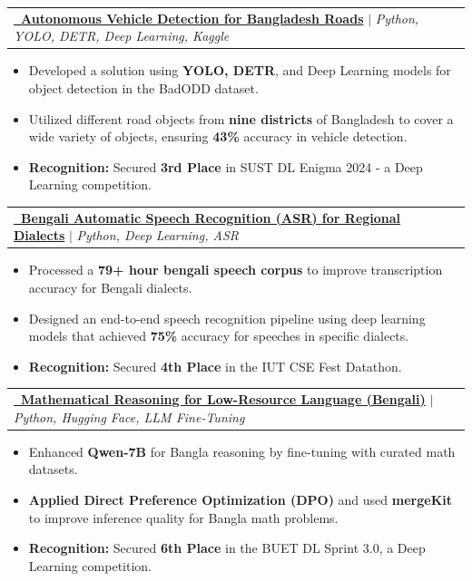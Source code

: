 \documentclass[letterpaper,11pt]{article}
\makeatletter
\newcommand{\customItem}[1]{
  \item\small{
    {#1 \vspace{-2pt}}
  }
}
\newcommand{\customProject}[2]{
    \item
    \begin{tabular*}{1.001\textwidth}{l@{\extracolsep{\fill}}r}
      \small#1 & \textbf{\small #2}\\
    \end{tabular*}\vspace{-7pt}
}
\newcommand{\customItemListStart}{\begin{itemize}}
\newcommand{\customItemListEnd}{\end{itemize}\vspace{-5pt}}
\makeatother
\begin{document}
      \customProject
          {\textbf{\href{https://www.kaggle.com/competitions/dl-enigma-10-sust-cse-carnival-2024/discussion/477648}
          {\faLink\ Autonomous Vehicle Detection for Bangladesh Roads}} $|$ 
          \emph{Python, YOLO, DETR, Deep Learning, Kaggle}}
          {}
          \customItemListStart
            \customItem{Developed a solution using \textbf{YOLO, DETR}, and Deep Learning models for object detection in the BadODD dataset.}
            \customItem{Utilized different road objects from \textbf{nine districts} of Bangladesh to cover a wide variety of objects, ensuring \textbf{43\%} accuracy in vehicle detection.}
            \customItem{\textbf{Recognition:} Secured \textbf{3rd Place} in SUST DL Enigma 2024 - a Deep Learning competition.}
          \customItemListEnd
          \vspace{-13pt}

      \customProject
          {\textbf{\href{https://www.kaggle.com/competitions/ben10/code?competitionId=73047\&searchQuery=DataDojo}
          {\faLink\ Bengali Automatic Speech Recognition (ASR) for Regional Dialects}} $|$ 
          \emph{Python, Deep Learning, ASR}}
          {}
          \customItemListStart
            \customItem{Processed a \textbf{79+ hour bengali speech corpus} to improve transcription accuracy for Bengali dialects.}
            \customItem{Designed an end-to-end speech recognition pipeline using deep learning models that achieved \textbf{75\%} accuracy for speeches in specific dialects.}
            \customItem{\textbf{Recognition:} Secured \textbf{4th Place} in the IUT CSE Fest Datathon.}
          \customItemListEnd
          \vspace{-13pt}

      \customProject
          {\textbf{\href{https://www.kaggle.com/competitions/dlsprint3/discussion/545581}
          {\faLink\ Mathematical Reasoning for Low-Resource Language (Bengali)}} $|$ 
          \emph{Python, Hugging Face, LLM Fine-Tuning}}
          {}
          \customItemListStart
            \customItem{Enhanced \textbf{Qwen-7B} for Bangla reasoning by fine-tuning with curated math datasets.}
            \customItem{\textbf{Applied Direct Preference Optimization (DPO)} and used \textbf{mergeKit} to improve inference quality for Bangla math problems.}
            \customItem{\textbf{Recognition:} Secured \textbf{6th Place} in the BUET DL Sprint 3.0, a Deep Learning competition.}
          \customItemListEnd
          \vspace{-13pt}
\end{document}
